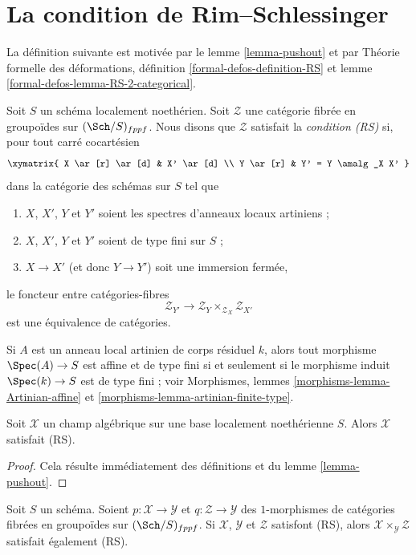 \section{La condition de Rim--Schlessinger}
\label{section-RS}

\noindent
La définition suivante est motivée par le lemme \ref{lemma-pushout} et par
Théorie formelle des déformations, définition
\ref{formal-defos-definition-RS} et lemme
\ref{formal-defos-lemma-RS-2-categorical}.

\begin{definition}
\label{definition-RS}
Soit $S$ un schéma localement noethérien. Soit $\mathcal{Z}$ une catégorie
fibrée en groupoïdes sur $(\Sch/S)_{fppf}$. Nous disons que $\mathcal{Z}$
satisfait la {\it condition (RS)} si, pour tout carré cocartésien
$$
\xymatrix{
X \ar[r] \ar[d] & X' \ar[d] \\
Y \ar[r] & Y' = Y \amalg_X X'
}
$$
dans la catégorie des schémas sur $S$ tel que
\begin{enumerate}
\item $X$, $X'$, $Y$ et $Y'$ soient les spectres d'anneaux locaux artiniens ;
\item $X$, $X'$, $Y$ et $Y'$ soient de type fini sur $S$ ;
\item $X \to X'$ (et donc $Y \to Y'$) soit une immersion fermée,
\end{enumerate}
le foncteur entre catégories-fibres
$$
\mathcal{Z}_{Y'}
\longrightarrow
\mathcal{Z}_Y \times_{\mathcal{Z}_X} \mathcal{Z}_{X'}
$$
est une équivalence de catégories.
\end{definition}

\noindent
Si $A$ est un anneau local artinien de corps résiduel $k$, alors tout morphisme
$\Spec(A) \to S$ est affine et de type fini si et seulement si le morphisme
induit $\Spec(k) \to S$ est de type fini ; voir Morphismes, lemmes
\ref{morphisms-lemma-Artinian-affine} et
\ref{morphisms-lemma-artinian-finite-type}.

\begin{lemma}
\label{lemma-algebraic-stack-RS}
Soit $\mathcal{X}$ un champ algébrique sur une base localement noethérienne
$S$. Alors $\mathcal{X}$ satisfait (RS).
\end{lemma}

\begin{proof}
Cela résulte immédiatement des définitions et du lemme \ref{lemma-pushout}.
\end{proof}

\begin{lemma}
\label{lemma-fibre-product-RS}
Soit $S$ un schéma. Soient $p : \mathcal{X} \to \mathcal{Y}$ et
$q : \mathcal{Z} \to \mathcal{Y}$ des $1$-morphismes de catégories fibrées en
groupoïdes sur $(\Sch/S)_{fppf}$. Si $\mathcal{X}$, $\mathcal{Y}$ et
$\mathcal{Z}$ satisfont (RS), alors
$\mathcal{X} \times_\mathcal{Y} \mathcal{Z}$ satisfait également (RS).
\end{lemma}

